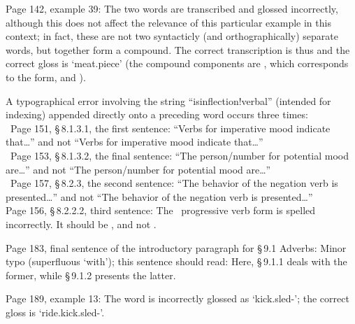 \documentclass[a4paper,11pt]{scrartcl}
\begin{document}

Page 142, example 39: The two words  are transcribed and glossed incorrectly, although this does not affect the relevance of this particular example in this context; in fact, these are not two syntacticly (and orthographically) separate words, but together form a compound. The correct transcription is thus  and the correct gloss is ‘meat.piece’ (the compound components are , which corresponds to the  form, and ). 




A typographical error involving the string “isinflection!verbal” (intended for indexing) appended directly onto a preceding word occurs three times: \\
\BULLET\ Page 151, §\,8.1.3.1, the first sentence: “Verbs  for imperative mood indicate that…” and not “Verbs  for imperative mood indicate that…”\\
\BULLET\ Page 153, §\,8.1.3.2, the final sentence: “The person/number  for potential mood are…” and not “The person/number  for potential mood are…”\\
\BULLET\ Page 157, §\,8.2.3, the second sentence: “The  behavior of the negation verb is presented…” and not “The  behavior of the negation verb is presented…”\\

Page 156, §\,8.2.2.2, third sentence: The \PS\ progressive verb form is spelled incorrectly. It should be , and not .



Page 183, final sentence of the introductory paragraph for §\,9.1 Adverbs: Minor typo (superfluous ‘with’); this sentence should read: Here, §\,9.1.1 deals with the former, while §\,9.1.2 presents the latter.



Page 189, example 13: The word  is incorrectly glossed as ‘kick.sled-’; the correct gloss is ‘ride.kick.sled-’. 
\end{document}
